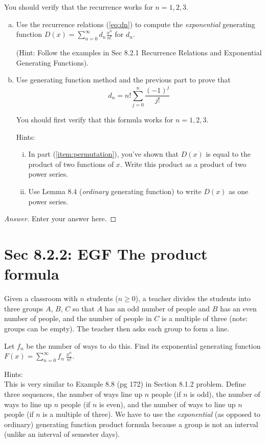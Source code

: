 \documentclass[12pt, oneside]{amsart}
\begin{document}
You should verify that the recurrence works for $n=1,2,3$.

\begin{enumerate}[a.]
	\item \label{item:permutation}
	Use the recurrence relations (\ref{eq:dn}) to compute the \emph{exponential} generating function $\displaystyle D(x)=\sum_{n=0}^\infty d_n \frac{x^n}{n!}$ for $d_n$. 
	
	{\tiny (Hint: Follow the examples in Sec 8.2.1 Recurrence Relations and Exponential Generating Functions).}
	
	\item
	Use generating function method and the previous part to prove that  
	\[
	d_n = n! \sum_{j=0}^n \frac{(-1)^j}{j!}
	\]
	
	You should first verify that this formula works for $n=1,2,3$.
	
	
{\tiny  \noindent Hints:
	 \begin{enumerate}[i.] \item In part (\ref{item:permutation}), you've shown that $D(x)$ is equal to the product of two functions of $x$. Write this product as a product of two power series. \item Use Lemma 8.4 (\emph{ordinary} generating function) to write $D(x)$ as one power series. \end{enumerate}
}
	
	
\end{enumerate}

\begin{proof}[Answer]
	Enter your answer here.
\end{proof}






\section{Sec 8.2.2: EGF The product formula}
Given a classroom with $n$ students ($n \geq 0$), 
a teacher divides the students into three groups $A$, $B$, $C$ so that $A$ has an odd number of people and $B$ has an even number of people, and the number of people in $C$ is a multiple of three (note: groups can be empty). The teacher then asks each group to form a line. 

Let $f_n$ be the number of ways to do this. 
Find its exponential generating function $\displaystyle F(x) = \sum_{n=0}^\infty f_n ~ \frac{x^n}{n!}$.

{\tiny \noindent Hints:
\\This is very similar to Example 8.8 (pg 172) in Section 8.1.2 problem. Define three sequences, the number of ways line up $n$ people (if $n$ is odd), the number of ways to line up $n$ people (if $n$ is even), and the number of ways to line up $n$ people (if $n$ is a multiple of three). We have to use the \emph{exponential} (as opposed to ordinary) generating function product formula because a group is not an interval (unlike an interval of semester days). %
}
\end{document}
